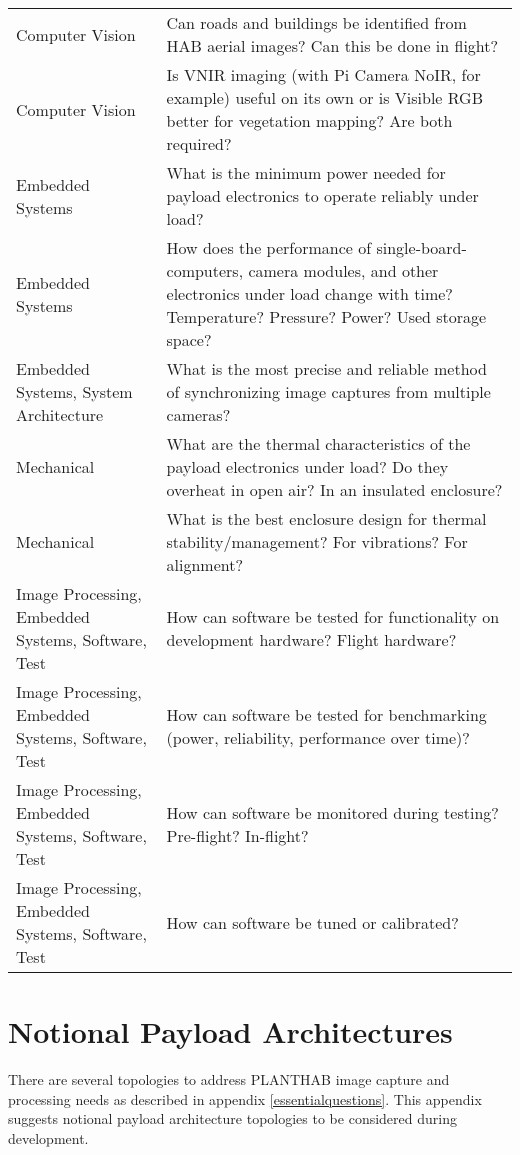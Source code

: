 \documentclass[conference]{IEEEtran} %
\begin{document}
\begin{table}[h!]
\begin{tabularx}{\linewidth}{@{}p{}X@{}}
    Computer Vision & Can roads and buildings be identified from HAB aerial images? Can this be done in flight? \\
    Computer Vision & Is VNIR imaging (with Pi Camera NoIR, for example) useful on its own or is Visible RGB better for vegetation mapping? Are both required? \\
    Embedded Systems & What is the minimum power needed for payload electronics to operate reliably under load? \\
    Embedded Systems & How does the performance of single-board-computers, camera modules, and other electronics under load change with time? Temperature? Pressure? Power? Used storage space? \\
    Embedded Systems, System Architecture & What is the most precise and reliable method of synchronizing image captures from multiple cameras? \\
    Mechanical & What are the thermal characteristics of the payload electronics under load? Do they overheat in open air? In an insulated enclosure? \\
    Mechanical & What is the best enclosure design for thermal stability/management? For vibrations? For alignment? \\
    Image Processing, Embedded Systems, Software, Test & How can software be tested for functionality on development hardware? Flight hardware? \\
    Image Processing, Embedded Systems, Software, Test & How can software be tested for benchmarking (power, reliability, performance over time)? \\
    Image Processing, Embedded Systems, Software, Test & How can software be monitored during testing? Pre-flight? In-flight? \\
    Image Processing, Embedded Systems, Software, Test & How can software be tuned or calibrated? \\
\end{tabularx}
\end{table}

\section{Notional Payload Architectures}
\label{architectures}
There are several topologies to address PLANTHAB image capture and processing needs as described in appendix \ref{essentialquestions}.
This appendix suggests notional payload architecture topologies to be considered during development.
\end{document}
